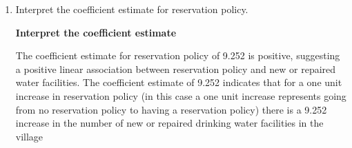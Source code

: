 \documentclass[12pt,letterpaper]{article}
\begin{document}
\begin{enumerate}
		\begin{verbatim}
Call:
lm(formula = women$water ~ women$reserved)

Residuals:
Min      1Q  Median      3Q     Max 
-23.991 -14.738  -7.865   2.262 316.009 

Coefficients:
               Estimate Std. Error t value Pr(>|t|)    
(Intercept)      14.738      2.286   6.446 4.22e-10 ***
women$reserved    9.252      3.948   2.344   0.0197 *  
---
Signif. codes:  0 ‘***’ 0.001 ‘**’ 0.01 ‘*’ 0.05 ‘.’ 0.1 ‘ ’ 1

Residual standard error: 33.45 on 320 degrees of freedom
Multiple R-squared:  0.01688,	Adjusted R-squared:  0.0138 
F-statistic: 5.493 on 1 and 320 DF,  p-value: 0.0197

		\end{verbatim}
		
		\item [(c)] Interpret the coefficient estimate for reservation policy. 

        \noindent \textbf {Interpret the coefficient estimate}
        

        \noindent The coefficient estimate for reservation policy of 9.252 is positive, suggesting a positive linear association between reservation policy and new or repaired water facilities. The coefficient estimate of 9.252 indicates that for a one unit increase in reservation policy (in this case a one unit increase represents going from no reservation policy to having a reservation policy) there is a 9.252 increase in the number of new or repaired drinking water facilities in the village
    	
	\end{enumerate}


	
\end{document}
